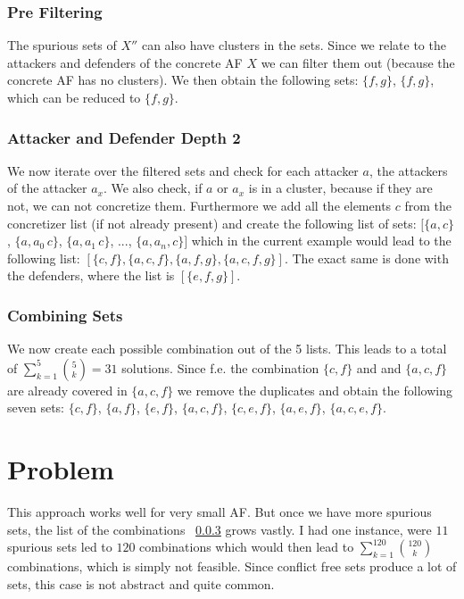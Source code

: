 \documentclass[twoside,openright]{scrreprt}
\begin{document}
\subsubsection{Pre Filtering}
The spurious sets of $X''$ can also have clusters in the sets. Since we relate to the attackers and defenders of the concrete AF $X$ we can filter them out (because the concrete
AF has no clusters). We then obtain the following sets: $\{f, g\}$, $\{f, g\}$, which can be reduced to $\{f, g\}$.
\subsubsection{Attacker and Defender Depth 2}
We now iterate over the filtered sets and check for each attacker $a$, the attackers of the attacker $a_x$. We also check, if $a$ or $a_x$ is in a cluster, because if they are not, we can not concretize them.
Furthermore we add all the elements $c$ from the concretizer list (if not already present) and create the following list of sets: $[\{a, c\}$, $\{a, a_0\, c\}$,  $\{a, a_1\, c\}$, $...$,  $\{a, a_n, c\}]$
which in the current example would lead to the following list: $[\{c, f\}, \{a, c, f\}, \{a, f, g\}, \{a, c, f, g\}]$.
The exact same is done with the defenders, where the list is $[\{e, f, g\}]$.
\subsubsection{Combining Sets}
\label{sssec:l}
We now create each possible combination out of the 5 lists. This leads to a total of $\sum_{k=1}^{5} {5 \choose k}=31$ solutions. Since f.e. the combination $\{c, f\}$ and and $\{a, c, f\}$ are already covered in $\{a, c, f\}$ we remove the duplicates and
obtain the following seven sets: $\{c, f\}$, $\{a, f\}$, $\{e, f\}$, $\{a, c, f\}$, $\{c, e, f\}$, $\{a, e, f\}$, $\{a, c, e, f\}$.

\section{Problem}
This approach works well for very small AF. But once we have more spurious sets, the list of the combinations ~\ref{sssec:l} grows vastly. I had one instance, were $11$ spurious sets led to $120$ combinations
which would then lead to  $\sum_{k=1}^{120} {120 \choose k}$ combinations, which is simply not feasible. Since conflict free sets produce a lot of sets, this case is not abstract and quite common.
\end{document}
